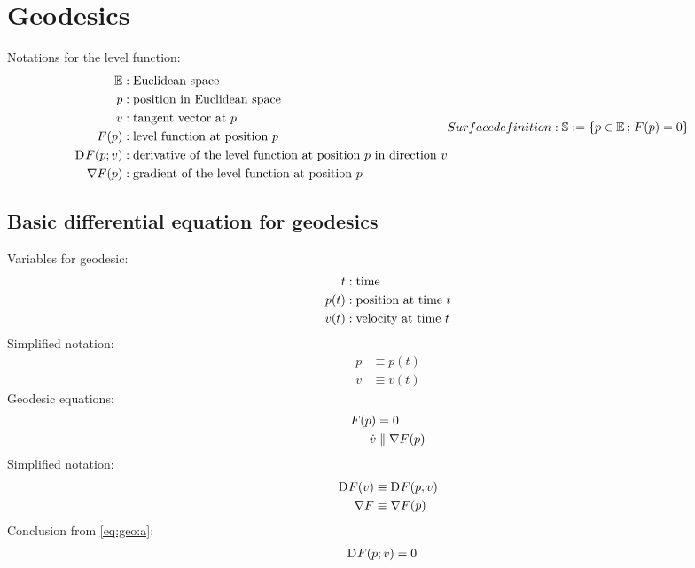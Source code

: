 \section{Geodesics}


Notations for the level function:
\begin{subequations}
\begin{align}
\mathbb{ E }  &:  \text{Euclidean space}\\
p  &:  \text{position in Euclidean space}\\
v  &:  \text{tangent vector at $ p $}\\
F( p )  &:  \text{level function at position $ p $}\\
\diff{}{ F }( p; v )  &:  \text{derivative of the level function at position $ p $ in direction $ v $}\\
\grad{ F }( p )  &:  \text{gradient of the level function at position $ p $}
\end{align}
Surface definition:
\begin{align}
\mathbb{ S }  &:=  \{ p \in \mathbb{ E } \,;\, F( p )  = 0 \}
\end{align}
\end{subequations}



\subsection{Basic differential equation for geodesics}



Variables for geodesic:
\begin{subequations}
\begin{align}
t  &:  \text{time}\\
p( t )  &:  \text{position at time $ t $}\\
v( t )  &:  \text{velocity at time $ t $}
\end{align}
\end{subequations}
Simplified notation:
\begin{subequations}
\begin{align}
p  &\equiv  p( t )\\
v  &\equiv  v( t )
\end{align}
\end{subequations}
Geodesic equations:
\begin{subequations}
\label{eq:geo}
\begin{align}
F( p )  &=  0
\label{eq:geo:a}\\
\dot{ v }  &\parallel  \nabla F ( p )
\label{eq:geo:b}
\end{align}
\end{subequations}
Simplified notation:
\begin{subequations}
\begin{align}
\mathrm{D}^{  } F ( v )  &\equiv  \mathrm{D}^{  } F ( p; v )\\
\nabla F          &\equiv  \nabla F ( p )
\end{align}
\end{subequations}
Conclusion from \eqref{eq:geo:a}:
\begin{align}
\mathrm{D}^{  } F ( p; v )  &=  0
\label{eq:geo:aa}
\end{align}

